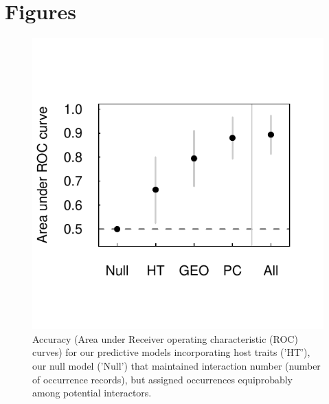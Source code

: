 \documentclass[12pt]{article}
\begin{document}
   
   
   

\newpage
\section{Figures}

\begin{figure}[h!]
  \includegraphics[width=\textwidth]{Figures/brtAccuracy.pdf}
  \caption{Accuracy (Area under Receiver operating characteristic (ROC) curves) for our predictive models incorporating host traits ('HT'),  our null model ('Null') that maintained interaction number (number of occurrence records), but assigned occurrences equiprobably among potential interactors.}
 \label{fig:brtAccuracy}
 \end{figure}
\end{document}
